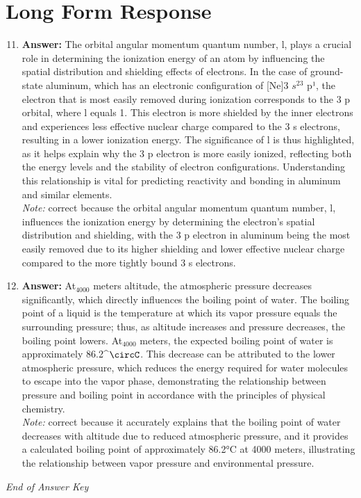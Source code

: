 \documentclass[12pt]{article}
\begin{document}
\section*{Long Form Response}
\begin{enumerate}[label=\arabic*.]
\setcounter{enumi}{10}
\item \textbf{Answer:} The orbital angular momentum quantum number, l, plays a crucial role in determining the ionization energy of an atom by influencing the spatial distribution and shielding effects of electrons. In the case of ground-state aluminum, which has an electronic configuration of [Ne]3 $s^23$ p¹, the electron that is most easily removed during ionization corresponds to the 3 p orbital, where l equals 1. This electron is more shielded by the inner electrons and experiences less effective nuclear charge compared to the 3 s electrons, resulting in a lower ionization energy. The significance of l is thus highlighted, as it helps explain why the 3 p electron is more easily ionized, reflecting both the energy levels and the stability of electron configurations. Understanding this relationship is vital for predicting reactivity and bonding in aluminum and similar elements.
\\ \textit{Note:} correct because the orbital angular momentum quantum number, l, influences the ionization energy by determining the electron's spatial distribution and shielding, with the 3 p electron in aluminum being the most easily removed due to its higher shielding and lower effective nuclear charge compared to the more tightly bound 3 s electrons.
\item \textbf{Answer:} At$_{4000}$ meters altitude, the atmospheric pressure decreases significantly, which directly influences the boiling point of water. The boiling point of a liquid is the temperature at which its vapor pressure equals the surrounding pressure; thus, as altitude increases and pressure decreases, the boiling point lowers. At$_{4000}$ meters, the expected boiling point of water is approximately 86.2^\ensuremath{\circC}. This decrease can be attributed to the lower atmospheric pressure, which reduces the energy required for water molecules to escape into the vapor phase, demonstrating the relationship between pressure and boiling point in accordance with the principles of physical chemistry.
\\ \textit{Note:} correct because it accurately explains that the boiling point of water decreases with altitude due to reduced atmospheric pressure, and it provides a calculated boiling point of approximately 86.2°C at 4000 meters, illustrating the relationship between vapor pressure and environmental pressure.
\end{enumerate}

\vfill
\noindent\textit{End of Answer Key}
\end{document}
